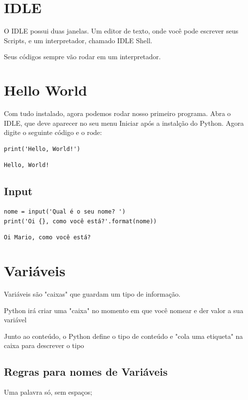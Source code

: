 \documentclass[presentation]{beamer}
\begin{document}
\section{IDLE}
\label{sec:orgheadline20}
O IDLE possui duas janelas. Um editor de texto, onde você pode escrever seus Scripts, e um interpretador, chamado IDLE Shell.

Seus códigos sempre vão rodar em um interpretador.
\section{Hello World}
\label{sec:orgheadline22}
Com tudo instalado, agora podemos rodar nosso primeiro programa. Abra o IDLE, que deve aparecer no seu menu Iniciar após a instalção do Python. Agora digite o seguinte código e o rode:

\begin{verbatim}
print('Hello, World!')
\end{verbatim}

\begin{verbatim}
Hello, World!
\end{verbatim}


\subsection{Input}
\label{sec:orgheadline21}
\begin{verbatim}
nome = input('Qual é o seu nome? ')
print('Oi {}, como você está?'.format(nome))
\end{verbatim}

\begin{verbatim}
Oi Mario, como você está?
\end{verbatim}
\section{Variáveis}
\label{sec:orgheadline24}
Variáveis são "caixas" que guardam um tipo de informação.

Python irá criar uma "caixa" no momento em que você nomear e der valor a sua variável

Junto ao conteúdo, o Python define o tipo de conteúdo e "cola uma etiqueta" na caixa para descrever o tipo
\subsection{Regras para nomes de Variáveis}
\label{sec:orgheadline23}
Uma palavra só, sem espaços;
\end{document}
